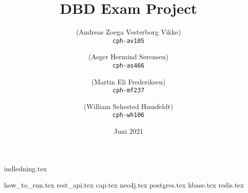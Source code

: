 \documentclass[10pt]{article}
\title{DBD Exam Project}
\author{
    (Andreas Zoega Vesterborg Vikke)\\
    \texttt{cph-av105}
    \and
    (Asger Hermind Sørensen)\\
    \texttt{cph-as466}
    \and
    (Martin Eli Frederiksen)\\
    \texttt{cph-mf237}
    \and
    (William Sehested Huusfeldt)\\
    \texttt{cph-wh106}
}
\date{Juni 2021}
\begin{document}
\hypersetup{pageanchor=false}

\maketitle
\newpage
{indledning.tex}
\tableofcontents
\newpage

{how_to_run.tex}
\newpage
{rest_api.tex}
{cap.tex}
\newpage
{neo4j.tex}
{postgres.tex}
\newpage
{hbase.tex}
\newpage
{redis.tex}

\newpage


\end{document}
